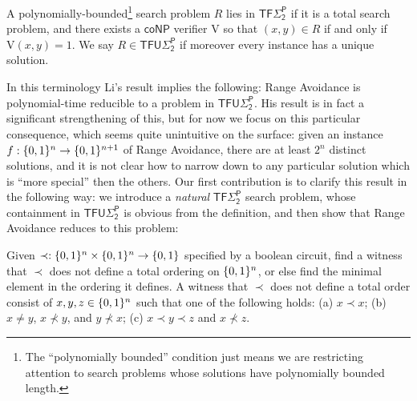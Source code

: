 \begin{definition}
\label{def:TFUSigma2}

A polynomially-bounded\footnote{The ``polynomially bounded'' condition just means we are restricting attention to search problems whose solutions have polynomially bounded length.} search problem $R$ lies in $\mathsf{TF\Sigma_2^P}$ if it is a total search problem, and there exists a $\mathsf{coNP}$ verifier $\mathrm{V}$ so that $(x,y) \in R$ if and only if $\mathrm{V}(x,y)=1$. We say $R \in \mathsf{TFU\Sigma_2^P}$ if moreover every instance has a unique solution.
\end{definition}
In this terminology Li's result implies the following: Range Avoidance is polynomial-time reducible to a problem in $\mathsf{TFU\Sigma_2^P}$. His result is in fact a significant strengthening of this, but for now we focus on this particular consequence, which seems quite unintuitive on the surface: given an instance $f: \{0,1\}^n \to \{0,1\}^{n+1}$ of Range Avoidance, there are at least $2^{n}$ distinct solutions, and it is not clear how to narrow down to any particular solution which is ``more special'' then the others. Our first contribution is to clarify this result in the following way: we introduce a \emph{natural} $\mathsf{TF\Sigma_2^P}$ search problem, whose containment in $\mathsf{TFU\Sigma_2^P}$ is obvious from the definition, and then show that Range Avoidance reduces to this problem: 
\begin{definition}\label{def:lop}
Given $\prec: \{0,1\}^n \times \{0,1\}^n \to \{0,1\}$ specified by a boolean circuit, find a witness that $\prec$ does not define a total ordering on $\{0,1\}^n$, or else find the minimal element in the ordering it defines. A witness that $\prec$ does not define a total order consist of $x,y,z \in \{0,1\}^n$ such that one of the following holds: (a) $x \prec x$; (b) $x\neq y$, $x \not\prec y $, and $ y \not\prec x$; (c) $x \prec y \prec z$ and $x \not\prec z$.
\end{definition}

